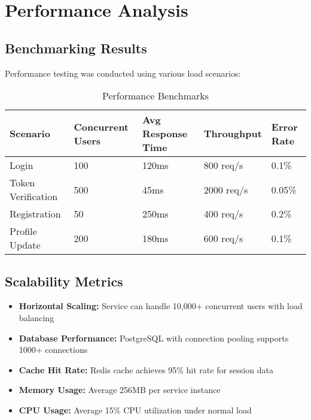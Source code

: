 \documentclass[12pt,a4paper]{article}
\begin{document}
\section{Performance Analysis}

\subsection{Benchmarking Results}

Performance testing was conducted using various load scenarios:

\begin{table}[H]
    \centering
    \begin{tabular}{|l|l|l|l|l|}
        \hline
        \textbf{Scenario} & \textbf{Concurrent Users} & \textbf{Avg Response Time} & \textbf{Throughput} & \textbf{Error Rate} \\
        \hline
        Login & 100 & 120ms & 800 req/s & 0.1\% \\
        \hline
        Token Verification & 500 & 45ms & 2000 req/s & 0.05\% \\
        \hline
        Registration & 50 & 250ms & 400 req/s & 0.2\% \\
        \hline
        Profile Update & 200 & 180ms & 600 req/s & 0.1\% \\
        \hline
    \end{tabular}
    \caption{Performance Benchmarks}
    \label{tab:performance}
\end{table}

\subsection{Scalability Metrics}

\begin{itemize}
    \item \textbf{Horizontal Scaling:} Service can handle 10,000+ concurrent users with load balancing
    \item \textbf{Database Performance:} PostgreSQL with connection pooling supports 1000+ connections
    \item \textbf{Cache Hit Rate:} Redis cache achieves 95\% hit rate for session data
    \item \textbf{Memory Usage:} Average 256MB per service instance
    \item \textbf{CPU Usage:} Average 15\% CPU utilization under normal load
\end{itemize}
\end{document}
